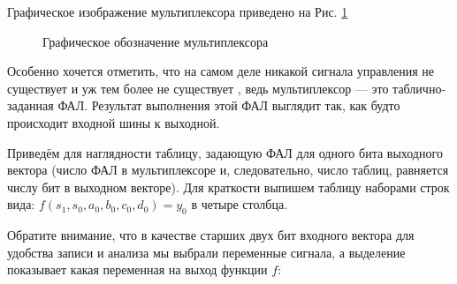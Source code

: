 \par{Графическое изображение мультиплексора приведено на Рис. \ref{fig:mux}}

\begin{figure}[H]
  \centering
  \def\svgwidth{\columnwidth}
  
  \caption{Графическое обозначение мультиплексора}
  \label{fig:mux}
\end{figure}

\par{Особенно хочется отметить, что на самом деле никакой  сигнала управления не существует и уж тем более не существует , ведь мультиплексор — это таблично-заданная ФАЛ. Результат выполнения этой ФАЛ выглядит так, как будто происходит   входной шины к выходной.}

\par{Приведём для наглядности таблицу, задающую ФАЛ для одного бита выходного вектора (число ФАЛ в мультиплексоре и, следовательно, число таблиц, равняется числу бит в выходном векторе). Для краткости выпишем таблицу наборами строк вида: $f(s_1, s_0, a_0, b_0, c_0, d_0) = y_0$ в четыре столбца.}

\par{Обратите внимание, что в качестве старших двух бит входного вектора для удобства записи и анализа мы выбрали переменные  сигнала, а выделение показывает какая переменная  на выход функции $f$:}

